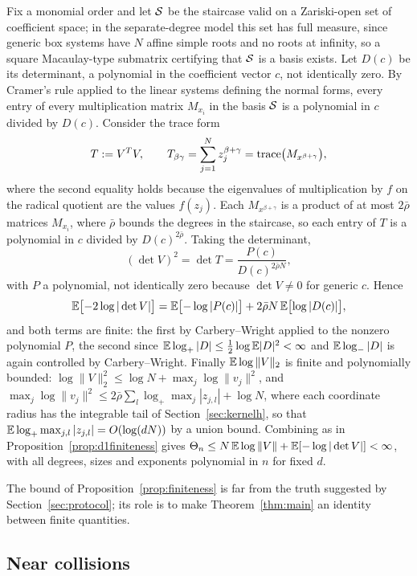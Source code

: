 \proof
Fix a monomial order and let $\mathcal{S}$ be the staircase valid on a Zariski-open set of
coefficient space; in the separate-degree model this set has full measure, since generic box
systems have $N$ affine simple roots and no roots at infinity, so a square Macaulay-type
submatrix certifying that $\mathcal{S}$ is a basis exists. Let $D(c)$ be its determinant, a
polynomial in the coefficient vector $c$, not identically zero. By Cramer's rule applied to
the linear systems defining the normal forms, every entry of every multiplication matrix
$M_{x_i}$ in the basis $\mathcal{S}$ is a polynomial in $c$ divided by $D(c)$. Consider the trace
form
\[
  T := V^TV, \qquad
  T_{\beta\gamma} = \sum_{j=1}^N z_j^{\beta+\gamma} = \operatorname{trace}\bigl(M_{x^{\beta+\gamma}}\bigr),
\]
where the second equality holds because the eigenvalues of multiplication by $f$ on the
radical quotient are the values $f(z_j)$. Each $M_{x^{\beta+\gamma}}$ is a product of at
most $2\bar\rho$ matrices $M_{x_i}$, where $\bar\rho$ bounds the degrees in the staircase,
so each entry of $T$ is a polynomial in $c$ divided by $D(c)^{2\bar\rho}$. Taking the
determinant,
\[
  (\det V)^2 = \det T = \frac{P(c)}{D(c)^{2\bar\rho N}},
\]
with $P$ a polynomial, not identically zero because $\det V\ne0$ for generic $c$. Hence
\[
  \mathbb{E}\bigl[-2\log|\det V|\bigr]
  = \mathbb{E}\bigl[-\log|P(c)|\bigr] + 2\bar\rho N\,\mathbb{E}\bigl[\log|D(c)|\bigr],
\]
and both terms are finite: the first by Carbery--Wright applied to the nonzero polynomial
$P$, the second since $\mathbb{E}\log_+|D|\le\frac12\log\mathbb{E}|D|^2<\infty$ and $\mathbb{E}\log_-|D|$ is again
controlled by Carbery--Wright. Finally $\mathbb{E}\log\|V\|_2$ is finite and polynomially bounded:
$\log\|V\|_2^2\le\log N + \max_j\log\|v_j\|^2$, and
$\max_j\log\|v_j\|^2\le2\bar\rho\sum_l\log_+\max_j|z_{j,l}| + \log N$, where each
coordinate radius has the integrable tail of Section~\ref{sec:kernelh}, so that
$\mathbb{E}\log_+\max_{j,l}|z_{j,l}| = O(\log(dN))$ by a union bound. Combining as in
Proposition~\ref{prop:d1finiteness} gives
$\Theta_n\le N\,\mathbb{E}\log\|V\| + \mathbb{E}[-\log|\det V|]<\infty$, with all degrees, sizes and
exponents polynomial in $n$ for fixed $d$.
\endproof

The bound of Proposition~\ref{prop:finiteness} is far from the truth suggested by
Section~\ref{sec:protocol}; its role is to make Theorem~\ref{thm:main} an identity between
finite quantities.

\subsection{Near collisions}\label{sec:collisions}

